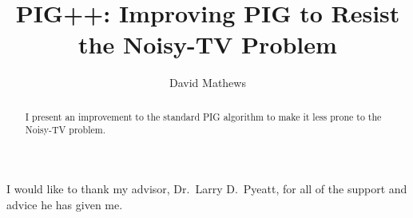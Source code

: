 \documentclass[12pt]{thesis}
\title{PIG++: Improving PIG to Resist the Noisy-TV Problem}
\author{David Mathews}
\begin{document}
\maketitle

\makecopyright %

\preliminaries

\begin{abstract}
I present an improvement to the standard PIG algorithm to make it less prone to the Noisy-TV problem.
\end{abstract}

\begin{acknowledgments}
  I would like to thank my advisor, Dr.\ Larry D.\ Pyeatt, for
  all of the support and advice he has given me.
\end{acknowledgments}


%
%





\end{document}
